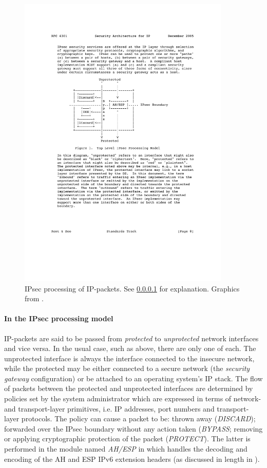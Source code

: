 \documentclass[final,a4paper,twoside,11pt,onecolumn]{report}
\begin{document}
\begin{figure}[h!]
   \includegraphics[width=0.9\textwidth]{ipsec-flow}
   \caption{IPsec processing of IP-packets. See \ref{ipsec_proc} for explanation. Graphics from \citep[p.8]{rfc4301}.}
   \label{fig:ipsec-flow}
\end{figure}

\paragraph{In the IPsec processing model} \label{ipsec_proc}
IP-packets are said to be passed from \emph{protected} to \emph{unprotected} network interfaces and vice versa. In the usual case, such as above, there are only one of each. The unprotected interface is always the interface connected to the insecure network, while the protected may be either connected to a secure network (the \emph{security gateway} configuration) or be attached to an operating system's IP stack. The flow of packets between the protected and unprotected interfaces are determined by policies set by the system administrator which are expressed in terms of network- and transport-layer primitives, i.e. IP addresses, port numbers and transport-layer protocols. The policy can cause a packet to be: thrown away (\emph{DISCARD}); forwarded over the IPsec boundary without any action taken (\emph{BYPASS}; removing or applying cryptographic protection of the packet (\emph{PROTECT}). The latter is performed in the module named \emph{AH/ESP} in  which handles the decoding and encoding of the AH and ESP IPv6 extension headers (as discussed in length in ).
   
\end{document}
